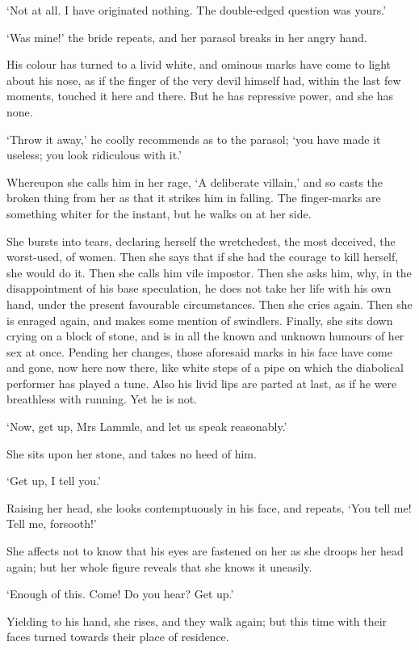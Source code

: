 ‘Not at all. I have originated nothing. The double-edged question was
yours.’

‘Was mine!’ the bride repeats, and her parasol breaks in her angry hand.

His colour has turned to a livid white, and ominous marks have come to
light about his nose, as if the finger of the very devil himself had,
within the last few moments, touched it here and there. But he has
repressive power, and she has none.

‘Throw it away,’ he coolly recommends as to the parasol; ‘you have made
it useless; you look ridiculous with it.’

Whereupon she calls him in her rage, ‘A deliberate villain,’ and so
casts the broken thing from her as that it strikes him in falling. The
finger-marks are something whiter for the instant, but he walks on at
her side.

She bursts into tears, declaring herself the wretchedest, the most
deceived, the worst-used, of women. Then she says that if she had
the courage to kill herself, she would do it. Then she calls him vile
impostor. Then she asks him, why, in the disappointment of his base
speculation, he does not take her life with his own hand, under the
present favourable circumstances. Then she cries again. Then she is
enraged again, and makes some mention of swindlers. Finally, she sits
down crying on a block of stone, and is in all the known and unknown
humours of her sex at once. Pending her changes, those aforesaid marks
in his face have come and gone, now here now there, like white steps
of a pipe on which the diabolical performer has played a tune. Also his
livid lips are parted at last, as if he were breathless with running.
Yet he is not.

‘Now, get up, Mrs Lammle, and let us speak reasonably.’

She sits upon her stone, and takes no heed of him.

‘Get up, I tell you.’

Raising her head, she looks contemptuously in his face, and repeats,
‘You tell me! Tell me, forsooth!’

She affects not to know that his eyes are fastened on her as she droops
her head again; but her whole figure reveals that she knows it uneasily.

‘Enough of this. Come! Do you hear? Get up.’

Yielding to his hand, she rises, and they walk again; but this time with
their faces turned towards their place of residence.

